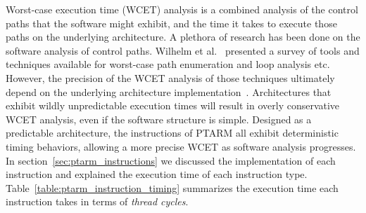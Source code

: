 \label{subsec:precision_timing_inst_ptarm}

Worst-case execution time (WCET) analysis is a combined analysis of the control paths that the software might exhibit, and the time it takes to execute those paths on the underlying architecture. 
A plethora of research has been done on the software analysis of control paths. 
Wilhelm et al.~\cite{wilhelm-survey-paper} presented a survey of tools and techniques available for worst-case path enumeration and loop analysis etc.
However, the precision of the WCET analysis of those techniques ultimately depend on the underlying architecture implementation~\cite{Heckmann2003processor}.
Architectures that exhibit wildly unpredictable execution times will result in overly conservative WCET analysis, even if the software structure is simple. 
Designed as a predictable architecture, the instructions of PTARM all exhibit deterministic timing behaviors, allowing a more precise WCET as software analysis progresses. 
In section~\ref{sec:ptarm_instructions} we discussed the implementation of each instruction and explained the execution time of each instruction type.
Table~\ref{table:ptarm_instruction_timing} summarizes the execution time each instruction takes in terms of \emph{thread cycles}. 

